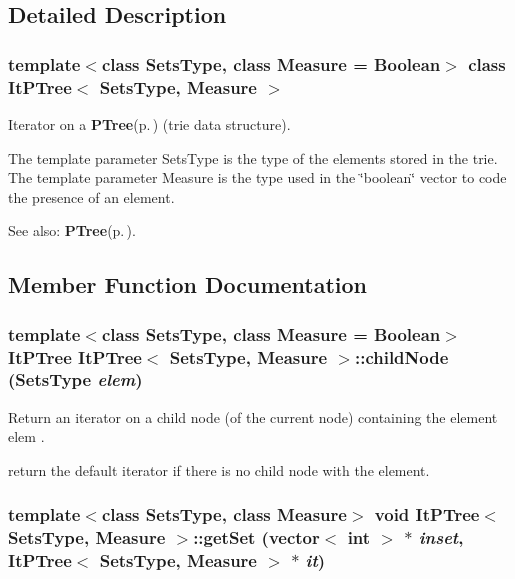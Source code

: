 \subsection{Detailed Description}
\subsubsection*{template$<$class Sets\-Type, class Measure = Boolean$>$ class It\-PTree$<$ Sets\-Type, Measure $>$}

Iterator on a {\bf PTree}{\rm (p.\,\pageref{class_p_tree})} (trie data structure). 

The template parameter Sets\-Type is the type of the elements stored in the trie. The template parameter Measure is the type used in the \char`\"{}boolean\char`\"{} vector to code the presence of an element. \begin{Desc}
\item[See also:]{\bf PTree}{\rm (p.\,\pageref{class_p_tree})}. \end{Desc}




\subsection{Member Function Documentation}
\subsubsection{\setlength{\rightskip}{0pt plus 5cm}template$<$class Sets\-Type, class Measure = Boolean$>$ {\bf It\-PTree} {\bf It\-PTree}$<$ Sets\-Type, Measure $>$::child\-Node (Sets\-Type {\em elem})\hspace{0.3cm}{\tt  [inline]}}\label{class_it_p_tree_91d6a798cefed637033d73de2ec00551}


Return an iterator on a child node (of the current node) containing the element elem . 

return the default iterator if there is no child node with the element. 
\subsubsection{\setlength{\rightskip}{0pt plus 5cm}template$<$class Sets\-Type, class Measure$>$ void {\bf It\-PTree}$<$ Sets\-Type, Measure $>$::get\-Set (vector$<$ int $>$ $\ast$ {\em inset}, {\bf It\-PTree}$<$ Sets\-Type, Measure $>$ $\ast$ {\em it})}\label{class_it_p_tree_5cb6cca573fcd5dc61612f1e42089fd0}


